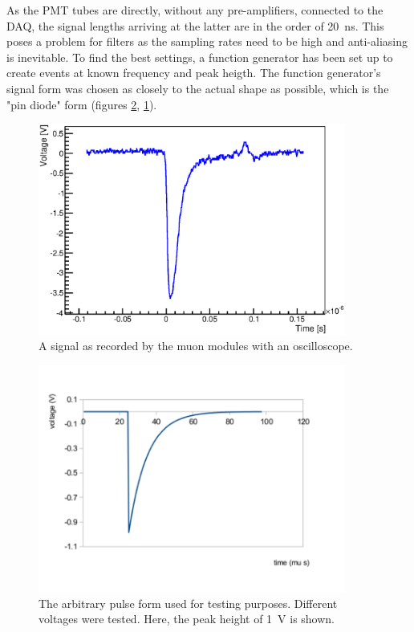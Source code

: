   
  As the PMT tubes are directly, without any pre-amplifiers, connected to the DAQ, the signal lengths arriving at the latter are in the order of \SI{20}{\nano\second}. This poses a problem for filters as the sampling rates need to be high and anti-aliasing is inevitable. To find the best settings, a function generator has been set up to create events at known frequency and peak heigth. The function generator's signal form was chosen as closely to the actual shape as possible, which is the "pin diode" form (figures \ref{fig:pinDiode}, \ref{fig:signalShape}).
  \begin{figure}
	\centering
	\includegraphics[width = 0.9\textwidth]{graphics/muonModules/monSpec/muonSignal.eps}
	\caption[Muon Signal Shape]{A signal as recorded by the muon modules with an oscilloscope.}
	\label{fig:signalShape}
  \end{figure}
	\begin{figure}
	\centering
	\includegraphics[width = 0.9\textwidth]{graphics/muonModules/mainSpec/pinDiode.pdf}
	\caption[Function Generator Pulse Shape]{The arbitrary pulse form used for testing purposes. Different voltages were tested. Here, the peak height of \SI{1}{\volt} is shown.}
	\label{fig:pinDiode}
  \end{figure}
  
